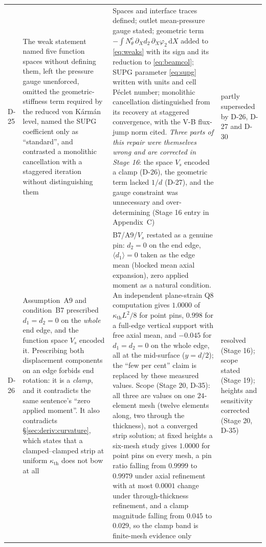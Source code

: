 \begin{longtable}{p{1cm}p{4.6cm}p{5.2cm}p{3.2cm}}
D-25 & The weak statement named five function spaces without defining them, left the pressure gauge unenforced, omitted the geometric-stiffness term required by the reduced von K\'arm\'an level, named the SUPG coefficient only as ``standard'', and contrasted a monolithic cancellation with a staggered iteration without distinguishing them & Spaces and interface traces defined; outlet mean-pressure gauge stated; geometric term $-\int N_\theta^c\,\partial_Xd_2\,\partial_X\varphi_2\,\mathrm dX$ added to \eqref{eq:weaks} with its sign and its reduction to \eqref{eq:beamcol}; SUPG parameter \eqref{eq:supg} written with units and cell P\'eclet number; monolithic cancellation distinguished from its recovery at staggered convergence, with the V-B flux-jump norm cited. \emph{Three parts of this repair were themselves wrong and are corrected in Stage 16}: the space $V_s$ encoded a clamp (D-26), the geometric term lacked $1/d$ (D-27), and the gauge constraint was unnecessary and over-determining (Stage 16 entry in Appendix~C) & partly superseded by D-26, D-27 and D-30 \\
D-26 & Assumption~A9 and condition~B7 prescribed $d_1=d_2=0$ on the \emph{whole} end edge, and the function space $V_s$ encoded it. Prescribing both displacement components on an edge forbids end rotation: it is a \emph{clamp}, and it contradicts the same sentence's ``zero applied moment''. It also contradicts \S\ref{sec:deriv:curvature}, which states that a clamped--clamped strip at uniform $\kappa_{\mathrm{th}}$ does not bow at all & B7/A9/$V_s$ restated as a genuine pin: $d_2=0$ on the end edge, $\langle d_1\rangle=0$ taken as the edge mean (blocked mean axial expansion), zero applied moment as a natural condition. An independent plane-strain Q8 computation gives $1.0000$ of $\kappa_{\mathrm{th}}L^2/8$ for point pins, $0.998$ for a full-edge vertical support with free axial mean, and $-0.045$ for $d_1=d_2=0$ on the whole edge, all at the mid-surface ($y=d/2$); the ``few per cent'' claim is replaced by these measured values. Scope (Stage 20, D-35): all three are values on one $24$-element mesh (twelve elements along, two through the thickness), not a converged strip solution; at fixed heights a six-mesh study gives $1.0000$ for point pins on every mesh, a pin ratio falling from $0.9999$ to $0.9979$ under axial refinement with at most $0.0001$ change under through-thickness refinement, and a clamp magnitude falling from $0.045$ to $0.029$, so the clamp band is finite-mesh evidence only & resolved (Stage 16); scope stated (Stage 19); heights and sensitivity corrected (Stage 20, D-35) \\

\end{longtable}
